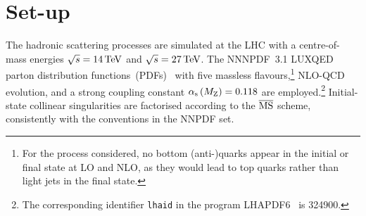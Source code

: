 \documentclass[11pt,epsf]{article}
\begin{document}
\section{Set-up}

The hadronic scattering processes are simulated at the LHC with a centre-of-mass energies $\sqrt s = 14 \,\text{TeV}$ and $\sqrt s = 27 \,\text{TeV}$.
    The NNNPDF~3.1 LUXQED parton distribution
    functions~(PDFs)~\cite{Bertone:2017bme} with five massless
    flavours,\footnote{For the process considered, no bottom
      (anti-)quarks appear in the initial or final state at LO and
      NLO, as they would lead to top quarks rather than light jets in the final state.} 
    NLO-QCD evolution, and a strong coupling constant $\alpha_\text{s}\left( M_\text{Z} \right) = 0.118$ are employed.\footnote{The corresponding identifier {\tt lhaid} in the program LHAPDF6~\cite{Buckley:2014ana} is 324900.}
    Initial-state collinear singularities are factorised according to
    the ${\overline{\rm MS}}$ scheme, consistently with the conventions in the NNPDF set.
\end{document}
